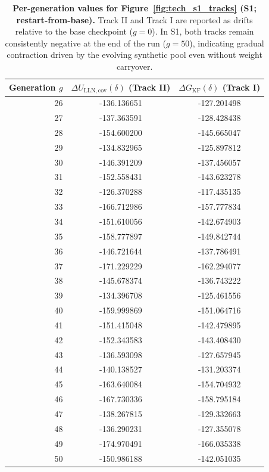 \documentclass{article}
\theoremstyle{plain}
\theoremstyle{definition}
\theoremstyle{remark}
\begin{document}
\begin{table}[ht!]
\begin{minipage}[t]{0.4\textwidth}
  \vspace{0pt}
\begin{tabular}{rcc}
\toprule
Generation $g$ & $\Delta U_{\mathrm{LLN,cov}}(\delta)$ (Track II) & $\Delta G_{\mathrm{KF}}(\delta)$ (Track I) \\
\midrule
26 & -136.136651 & -127.201498 \\
27 & -137.363591 & -128.428438 \\
28 & -154.600200 & -145.665047 \\
29 & -134.832965 & -125.897812 \\
30 & -146.391209 & -137.456057 \\
31 & -152.558431 & -143.623278 \\
32 & -126.370288 & -117.435135 \\
33 & -166.712986 & -157.777834 \\
34 & -151.610056 & -142.674903 \\
35 & -158.777897 & -149.842744 \\
36 & -146.721644 & -137.786491 \\
37 & -171.229229 & -162.294077 \\
38 & -145.678374 & -136.743222 \\
39 & -134.396708 & -125.461556 \\
40 & -159.999869 & -151.064716 \\
41 & -151.415048 & -142.479895 \\
42 & -152.343583 & -143.408430 \\
43 & -136.593098 & -127.657945 \\
44 & -140.138527 & -131.203374 \\
45 & -163.640084 & -154.704932 \\
46 & -167.730336 & -158.795184 \\
47 & -138.267815 & -129.332663 \\
48 & -136.290231 & -127.355078 \\
49 & -174.970491 & -166.035338 \\
50 & -150.986188 & -142.051035 \\
\bottomrule
\end{tabular}
\end{minipage}
\caption{
\textbf{Per-generation values for Figure~\ref{fig:tech_s1_tracks} (S1; restart-from-base).}
Track II and Track I are reported as drifts relative to the base checkpoint ($g=0$). In S1, both tracks remain consistently negative at the end of the run ($g=50$), indicating gradual contraction driven by the evolving synthetic pool even without weight carryover.
}
\label{tab:tech_s1_table}
\end{table}
\end{document}
